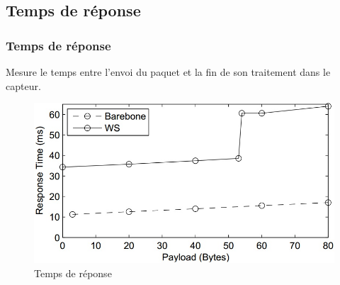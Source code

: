 
\subsection{Temps de réponse}
\begin{frame}
 \frametitle{Temps de réponse}
 Mesure le temps entre l'envoi du paquet et la fin de son traitement dans le capteur.
 \begin{figure}
  \centering
  \includegraphics[scale=0.35]{figures/treponse.jpg}
  \caption{Temps de réponse}
 \end{figure} 
\end{frame}
 
